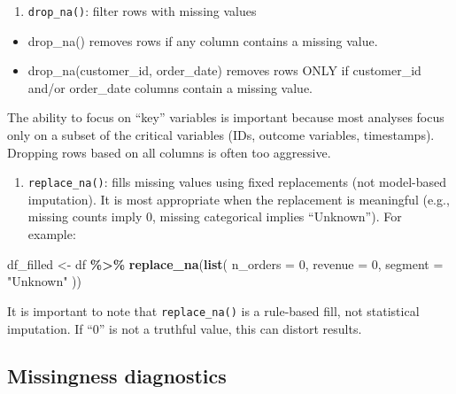 \documentclass[
  11pt,
]{article}
\newenvironment{Shaded}{\begin{snugshade}}{\end{snugshade}}
\newcommand{\AttributeTok}[1]{\textcolor[rgb]{0.13,0.29,0.53}{#1}}
\newcommand{\DecValTok}[1]{\textcolor[rgb]{0.00,0.00,0.81}{#1}}
\newcommand{\FunctionTok}[1]{\textcolor[rgb]{0.13,0.29,0.53}{\textbf{#1}}}
\newcommand{\NormalTok}[1]{#1}
\newcommand{\OtherTok}[1]{\textcolor[rgb]{0.56,0.35,0.01}{#1}}
\newcommand{\SpecialCharTok}[1]{\textcolor[rgb]{0.81,0.36,0.00}{\textbf{#1}}}
\newcommand{\StringTok}[1]{\textcolor[rgb]{0.31,0.60,0.02}{#1}}
\providecommand{\tightlist}{%
  \setlength{\itemsep}{0pt}\setlength{\parskip}{0pt}}
\begin{document}
\begin{enumerate}
\def\labelenumi{\arabic{enumi}.}
\tightlist
\item
  \texttt{drop\_na()}: filter rows with missing values
\end{enumerate}

\begin{itemize}
\tightlist
\item
  drop\_na() removes rows if any column contains a missing value.
\item
  drop\_na(customer\_id, order\_date) removes rows ONLY if customer\_id
  and/or order\_date columns contain a missing value.
\end{itemize}

The ability to focus on ``key'' variables is important because most
analyses focus only on a subset of the critical variables (IDs, outcome
variables, timestamps). Dropping rows based on all columns is often too
aggressive.

\begin{enumerate}
\def\labelenumi{\arabic{enumi}.}
\setcounter{enumi}{1}
\tightlist
\item
  \texttt{replace\_na()}: fills missing values using fixed replacements
  (not model-based imputation). It is most appropriate when the
  replacement is meaningful (e.g., missing counts imply 0, missing
  categorical implies ``Unknown''). For example:
\end{enumerate}

\begin{Shaded}
\begin{Highlighting}[]
\NormalTok{df\_filled }\OtherTok{\textless{}{-}}\NormalTok{ df }\SpecialCharTok{\%\textgreater{}\%}
  \FunctionTok{replace\_na}\NormalTok{(}\FunctionTok{list}\NormalTok{(}
    \AttributeTok{n\_orders =} \DecValTok{0}\NormalTok{,}
    \AttributeTok{revenue  =} \DecValTok{0}\NormalTok{,}
    \AttributeTok{segment  =} \StringTok{"Unknown"}
\NormalTok{  ))}
\end{Highlighting}
\end{Shaded}

It is important to note that \texttt{replace\_na()} is a rule-based
fill, not statistical imputation. If ``0'' is not a truthful value, this
can distort results.

\subsection{Missingness diagnostics}\label{missingness-diagnostics}
\end{document}
